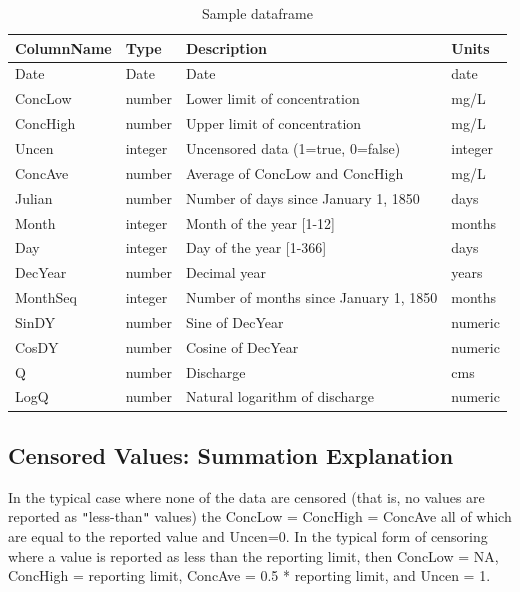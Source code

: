 \documentclass[a4paper,11pt]{article}\usepackage[]{graphicx}\usepackage[]{color}
\begin{document}
\begin{table}[!ht]
\begin{minipage}{\linewidth}
\begin{center}
\caption{Sample dataframe} 
\begin{tabular}{llll}
  \hline
ColumnName & Type & Description & Units \\ 
  \hline
Date & Date & Date & date \\ 
  ConcLow & number & Lower limit of concentration & mg/L \\ 
  ConcHigh & number & Upper limit of concentration & mg/L \\ 
  Uncen & integer & Uncensored data (1=true, 0=false) & integer \\ 
  ConcAve & number & Average of ConcLow and ConcHigh & mg/L \\ 
  Julian & number & Number of days since January 1, 1850 & days \\ 
  Month & integer & Month of the year [1-12] & months \\ 
  Day & integer & Day of the year [1-366] & days \\ 
  DecYear & number & Decimal year & years \\ 
  MonthSeq & integer & Number of months since January 1, 1850 & months \\ 
  SinDY & number & Sine of DecYear & numeric \\ 
  CosDY & number & Cosine of DecYear & numeric \\ 
  Q \footnotemark[1] & number & Discharge & cms \\ 
  LogQ \footnotemark[1] & number & Natural logarithm of discharge & numeric \\ 
   \hline
\end{tabular}
\end{center}
\end{minipage}
\end{table}


\FloatBarrier


\subsection{Censored Values: Summation Explanation}
In the typical case where none of the data are censored (that is, no values are reported as \texttt{"}less-than\texttt{"} values) the ConcLow = ConcHigh = ConcAve all of which are equal to the reported value and Uncen=0.  In the typical form of censoring where a value is reported as less than the reporting limit, then ConcLow = NA, ConcHigh = reporting limit, ConcAve = 0.5 * reporting limit, and Uncen = 1.
\end{document}
